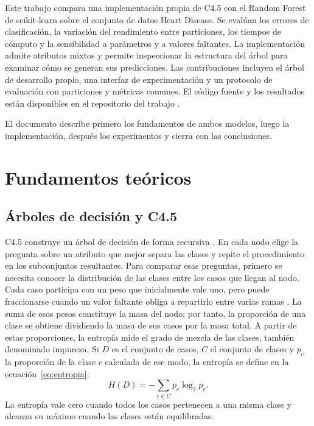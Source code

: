 \documentclass[runningheads]{llncs}
\begin{document}
Este trabajo compara una implementación propia de C4.5 con el Random Forest de scikit-learn \cite{scikitRF} sobre el conjunto de datos Heart Disease. Se evalúan los errores de clasificación, la variación del rendimiento entre particiones, los tiempos de cómputo y la sensibilidad a parámetros y a valores faltantes. La implementación admite atributos mixtos y permite inspeccionar la estructura del árbol para examinar cómo se generan sus predicciones. Las contribuciones incluyen el árbol de desarrollo propio, una interfaz de experimentación y un protocolo de evaluación con particiones y métricas comunes. El código fuente y los resultados están disponibles en el repositorio del trabajo \cite{repositorio2026}.

El documento describe primero los fundamentos de ambos modelos, luego la implementación, después los experimentos y cierra con las conclusiones.

\section{Fundamentos teóricos}

\subsection{Árboles de decisión y C4.5}

C4.5 construye un árbol de decisión de forma recursiva \cite{liu2011}. En cada nodo elige la pregunta sobre un atributo que mejor separa las clases y repite el procedimiento en los subconjuntos resultantes. Para comparar esas preguntas, primero se necesita conocer la distribución de las clases entre los casos que llegan al nodo. Cada caso participa con un peso que inicialmente vale uno, pero puede fraccionarse cuando un valor faltante obliga a repartirlo entre varias ramas \cite{liu2011}. La suma de esos pesos constituye la masa del nodo; por tanto, la proporción de una clase se obtiene dividiendo la masa de sus casos por la masa total. A partir de estas proporciones, la entropía mide el grado de mezcla de las clases, también denominado impureza. Si $D$ es el conjunto de casos, $C$ el conjunto de clases y $p_c$ la proporción de la clase $c$ calculada de ese modo, la entropía se define en la ecuación~\eqref{eq:entropia}:
\begin{equation}
H(D) = -\sum_{c \in C} p_c \log_2 p_c.
\label{eq:entropia}
\end{equation}
La entropía vale cero cuando todos los casos pertenecen a una misma clase y alcanza su máximo cuando las clases están equilibradas.
\end{document}
